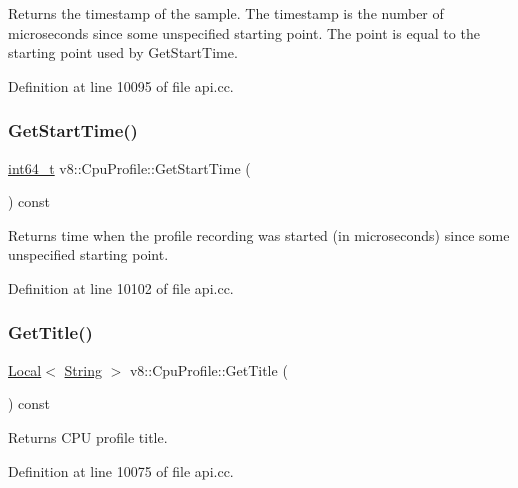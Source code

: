 Returns the timestamp of the sample. The timestamp is the number of microseconds since some unspecified starting point. The point is equal to the starting point used by Get\+Start\+Time. 

Definition at line 10095 of file api.\+cc.

\mbox{\label{classv8_1_1CpuProfile_a9f7a7d6a8cdc68bad1016a428eef4cd0}} 
\subsubsection{\texorpdfstring{Get\+Start\+Time()}{GetStartTime()}}
{\footnotesize\ttfamily \mbox{\hyperlink{classint64__t}{int64\+\_\+t}} v8\+::\+Cpu\+Profile\+::\+Get\+Start\+Time (\begin{DoxyParamCaption}{ }\end{DoxyParamCaption}) const}

Returns time when the profile recording was started (in microseconds) since some unspecified starting point. 

Definition at line 10102 of file api.\+cc.

\mbox{\label{classv8_1_1CpuProfile_a4e0e9bfbd38c9bdc7f89df7321f538d8}} 
\subsubsection{\texorpdfstring{Get\+Title()}{GetTitle()}}
{\footnotesize\ttfamily \mbox{\hyperlink{classv8_1_1Local}{Local}}$<$ \mbox{\hyperlink{classv8_1_1String}{String}} $>$ v8\+::\+Cpu\+Profile\+::\+Get\+Title (\begin{DoxyParamCaption}{ }\end{DoxyParamCaption}) const}

Returns C\+PU profile title. 

Definition at line 10075 of file api.\+cc.

\mbox{\label{classv8_1_1CpuProfile_a0078414604a4d7617809281e650cb9d6}} 
